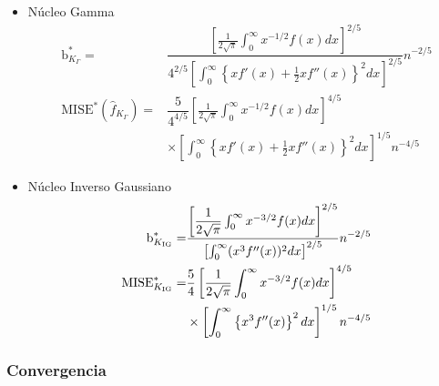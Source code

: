 \begin{itemize}
	\item Núcleo Gamma
	\begin{align}
	\label{MISEoptGamma}
	\text{b}^*_{K_\Gamma}=&\dfrac{\left[\frac{1}{2\sqrt{\pi}} \int_{0}^{\infty} x^{-1/2}f(x)dx \right]^{2/5}}
	{4^{2/5} \left[\int_{0}^{\infty}  \left\{x f'(x) +\frac{1}{2} x f''(x)\right\}^2 dx \right]^{2/5}} n^{-2/5}\\
	\nonumber \text{MISE}^*(\widehat{f}_{K_\Gamma})=&\dfrac{5}{4^{4/5}} \left[\frac{1}{2\sqrt{\pi}} \int_{0}^{\infty} x^{-1/2}f(x)dx \right]^{4/5} \\
	&\times \left[\int_{0}^{\infty}  \left\{x f'(x) +\frac{1}{2} x f''(x)\right\}^2 dx \right]^{1/5} n^{-4/5} 
	\end{align}
	\item Núcleo Inverso Gaussiano
	\begin{align}
	\label{MISEoptIG}
	\text{b}^*_{K_{\tiny \text{IG}}}=&\dfrac{\left[\dfrac{1}{2\sqrt{\pi}} \int_{0}^{\infty} x^{-3/2}f(x)dx \right]^{2/5}}
	{ \left[\int_{0}^{\infty}(x^3 f''(x))^2 dx \right]^{2/5}} n^{-2/5}\\
	\nonumber \text{MISE}^*_{K_{\tiny \text{IG}}}=&\dfrac{5}{4} \left[\frac{1}{2\sqrt{\pi}} \int_{0}^{\infty} x^{-3/2}f(x)dx \right]^{4/5} \\
	&\times \left[\int_{0}^{\infty}  \left\{x^3 f''(x) \right\}^2 dx \right]^{1/5} n^{-4/5} 
	\end{align}
\end{itemize}



\subsubsection{Convergencia}

